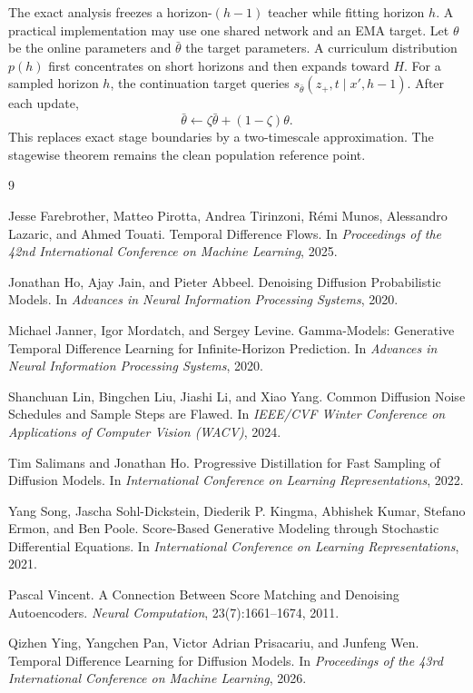 \documentclass[11pt]{article}
\theoremstyle{definition}
\theoremstyle{remark}
\newcommand{\score}{s}
\begin{document}
The exact analysis freezes a horizon-$(h-1)$ teacher while fitting horizon $h$.
A practical implementation may use one shared network and an EMA target. Let
$\theta$ be the online parameters and $\bar\theta$ the target parameters. A
curriculum distribution $p(h)$ first concentrates on short horizons and then
expands toward $H$. For a sampled horizon $h$, the continuation target queries
$\score_{\bar\theta}(z_+,t\mid x',h-1)$. After each update,
\begin{equation}
\bar\theta
\leftarrow
\zeta\bar\theta+(1-\zeta)\theta.
\end{equation}
This replaces exact stage boundaries by a two-timescale approximation. The
stagewise theorem remains the clean population reference point.

\begin{thebibliography}{9}

Jesse Farebrother, Matteo Pirotta, Andrea Tirinzoni, R\'emi Munos,
Alessandro Lazaric, and Ahmed Touati.
\newblock Temporal Difference Flows.
\newblock In \emph{Proceedings of the 42nd International Conference on
Machine Learning}, 2025.

Jonathan Ho, Ajay Jain, and Pieter Abbeel.
\newblock Denoising Diffusion Probabilistic Models.
\newblock In \emph{Advances in Neural Information Processing Systems}, 2020.

Michael Janner, Igor Mordatch, and Sergey Levine.
\newblock Gamma-Models: Generative Temporal Difference Learning for
Infinite-Horizon Prediction.
\newblock In \emph{Advances in Neural Information Processing Systems}, 2020.

Shanchuan Lin, Bingchen Liu, Jiashi Li, and Xiao Yang.
\newblock Common Diffusion Noise Schedules and Sample Steps are Flawed.
\newblock In \emph{IEEE/CVF Winter Conference on Applications of Computer
Vision (WACV)}, 2024.

Tim Salimans and Jonathan Ho.
\newblock Progressive Distillation for Fast Sampling of Diffusion Models.
\newblock In \emph{International Conference on Learning Representations}, 2022.

Yang Song, Jascha Sohl-Dickstein, Diederik P. Kingma, Abhishek Kumar,
Stefano Ermon, and Ben Poole.
\newblock Score-Based Generative Modeling through Stochastic Differential
Equations.
\newblock In \emph{International Conference on Learning Representations},
2021.

Pascal Vincent.
\newblock A Connection Between Score Matching and Denoising Autoencoders.
\newblock \emph{Neural Computation}, 23(7):1661--1674, 2011.

Qizhen Ying, Yangchen Pan, Victor Adrian Prisacariu, and Junfeng Wen.
\newblock Temporal Difference Learning for Diffusion Models.
\newblock In \emph{Proceedings of the 43rd International Conference on
Machine Learning}, 2026.

\end{thebibliography}
\end{document}

